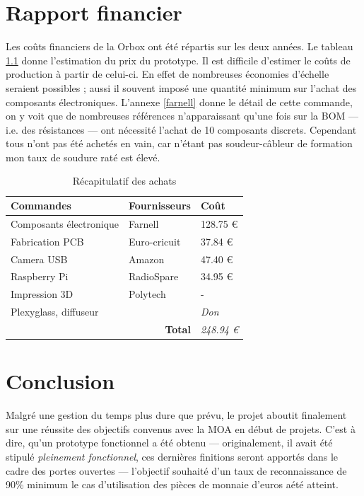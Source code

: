\documentclass[a4paper]{report}
\begin{document}
\chapter{Rapport financier}

Les coûts financiers de la Orbox ont été répartis sur les deux années.
Le tableau \ref{finance} donne l'estimation du prix du prototype.
Il est difficile d'estimer le coûts de production à partir de celui-ci.
En effet de nombreuses économies d'échelle seraient possibles ; aussi il souvent imposé une quantité minimum sur l'achat des composants électroniques.
L'annexe \ref{farnell} donne le détail de cette commande, on y voit que de nombreuses références n'apparaissant qu'une fois sur la BOM --- i.e. des résistances --- ont nécessité l'achat de 10 composants discrets.
Cependant tous n'ont pas été achetés en vain, car n'étant pas soudeur-câbleur de formation mon taux de soudure raté est élevé.

\begin{table}[H]
\centering
\begin{tabular}{@{}lll@{}}
\toprule
\textbf{Commandes} & \textbf{Fournisseurs} & \textbf{Coût} \\ \midrule
Composants électronique & Farnell & 128.75 € \\ 
Fabrication PCB & Euro-cricuit & 37.84 € \\ 
Camera USB & Amazon & 47.40 € \\ 
Raspberry Pi & RadioSpare & 34.95 € \\ 
Impression 3D & Polytech & - \\ 
Plexyglass, diffuseur   & & \textit{Don} \\ \midrule
\multicolumn{2}{r}{\textbf{Total}} & \textit{248.94 €} \\ \bottomrule
\end{tabular}
\caption{Récapitulatif des achats}
\label{finance}
\end{table}

\chapter{Conclusion}
Malgré une gestion du temps plus dure que prévu, le projet aboutit finalement sur une réussite des objectifs convenus avec la MOA en début de projets.
C'est à dire, qu'un prototype fonctionnel a été obtenu --- originalement, il avait été stipulé \emph{pleinement fonctionnel}, ces dernières finitions seront apportés dans le cadre des portes ouvertes --- l'objectif souhaité d'un taux de reconnaissance de 90\% minimum le cas d'utilisation des pièces de monnaie d'euros aété atteint.




\end{document}
